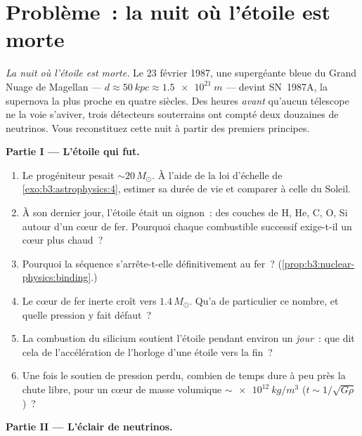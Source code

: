 \section{Problème~: la nuit où l'étoile est morte}

\begin{problem}\label{pb:b3:astrophysics:1}
\emph{La nuit où l'étoile est morte.} Le 23 février 1987, une
supergéante bleue du Grand Nuage de Magellan --- $d \approx
\qty{50}{kpc} \approx \qty{1.5e21}{m}$ --- devint SN~1987A, la
supernova la plus proche en quatre siècles. Des heures \emph{avant}
qu'aucun télescope ne la voie s'aviver, trois détecteurs souterrains
ont compté deux douzaines de neutrinos. Vous reconstituez cette nuit
à partir des premiers principes.

\medskip\noindent\textbf{Partie I --- L'étoile qui fut.}

\begin{enumerate}
  \item Le progéniteur pesait ${\sim}20\,M_\odot$. À l'aide de la
        loi d'échelle de \cref{exo:b3:astrophysics:4}, estimer sa
        durée de vie et comparer à celle du Soleil.
  \item À son dernier jour, l'étoile était un oignon~: des couches
        de H, He, C, O, Si autour d'un cœur de fer. Pourquoi chaque
        combustible successif exige-t-il un cœur plus chaud~?
  \item Pourquoi la séquence s'arrête-t-elle définitivement au fer~?
        (\cref{prop:b3:nuclear-physics:binding}.)
  \item Le cœur de fer inerte croît vers $1.4\,M_\odot$. Qu'a de
        particulier ce nombre, et quelle pression y fait défaut~?
  \item La combustion du silicium soutient l'étoile pendant environ
        un \emph{jour}~: que dit cela de l'accélération de
        l'horloge d'une étoile vers la fin~?
  \item Une fois le soutien de pression perdu, combien de temps
        dure à peu près la chute libre, pour un cœur de masse
        volumique $\sim\qty{e12}{kg/m^3}$
        ($t \sim 1/\sqrt{G\rho}$)~?
\end{enumerate}

\medskip\noindent\textbf{Partie II --- L'éclair de neutrinos.}


\end{problem}
